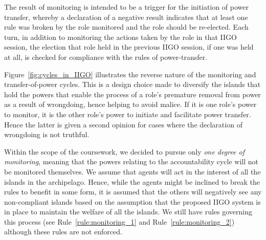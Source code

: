 
The result of monitoring is intended to be a trigger for the initiation of power transfer, whereby a declaration of a negative result indicates that at least one rule was broken by the role monitored and the role should be re-elected. Each turn, in addition to monitoring the actions taken by the role in that IIGO session, the election that role held in the previous IIGO session, if one was held at all, is checked for compliance with the rules of power-transfer.

Figure~\ref{fig:cycles_in_IIGO} illustrates the reverse nature of the monitoring and transfer-of-power cycles. This is a design choice made to diversify the islands that hold the powers that enable the process of a role's premature removal from power as a result of wrongdoing, hence helping to avoid malice. If it is one role's power to monitor, it is the other role's power to initiate and facilitate power transfer. Hence the latter is given a second opinion for cases where the declaration of wrongdoing is not truthful.

Within the scope of the coursework, we decided to pursue only \emph{one degree of monitoring}, meaning that the powers relating to the accountability cycle will not be monitored themselves. We assume that agents will act in the interest of all the islands in the archipelago. Hence, while the agents might be inclined to break the rules to benefit in some form, it is assumed that the others will negatively see any non-compliant islands based on the assumption that the proposed IIGO system is in place to maintain the welfare of all the islands. We still have rules governing this process (see Rule~\ref{rule:monitoring_1} and Rule~\ref{rule:monitoring_2}) although these rules are not enforced.


